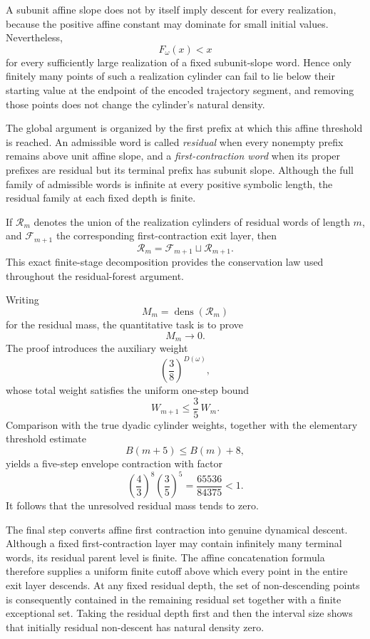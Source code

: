 \documentclass[12pt, oneside]{article}
\numberwithin{equation}{section}
\theoremstyle{definition}
\theoremstyle{plain}
\theoremstyle{remark}
\begin{document}
A subunit affine slope does not by itself imply descent for every
realization, because the positive affine constant may dominate for small
initial values. Nevertheless,
\[
F_\omega(x)<x
\]
for every sufficiently large realization of a fixed subunit-slope word.
Hence only finitely many points of such a realization cylinder can fail to
lie below their starting value at the endpoint of the encoded trajectory
segment, and removing those points does not change the cylinder's natural
density.

The global argument is organized by the first prefix at which this affine
threshold is reached. An admissible word is called \emph{residual} when every
nonempty prefix remains above unit affine slope, and a
\emph{first-contraction word} when its proper prefixes are residual but its
terminal prefix has subunit slope. Although the full family of admissible
words is infinite at every positive symbolic length, the residual family at
each fixed depth is finite.

If \(\mathcal R_m\) denotes the union of the realization cylinders of
residual words of length \(m\), and \(\mathcal F_{m+1}\) the corresponding
first-contraction exit layer, then
\[
\mathcal R_m
=
\mathcal F_{m+1}
\sqcup
\mathcal R_{m+1}.
\]
This exact finite-stage decomposition provides the conservation law used
throughout the residual-forest argument.

Writing
\[
M_m
=
\operatorname{dens}(\mathcal R_m)
\]
for the residual mass, the quantitative task is to prove
\[
M_m\longrightarrow0.
\]
The proof introduces the auxiliary weight
\[
\left(\frac38\right)^{D(\omega)},
\]
whose total weight satisfies the uniform one-step bound
\[
W_{m+1}\le\frac35\,W_m.
\]
Comparison with the true dyadic cylinder weights, together with
the elementary threshold estimate
\[
B(m+5)\le B(m)+8,
\]
yields a five-step envelope contraction with factor
\[
\left(\frac43\right)^8
\left(\frac35\right)^5
=
\frac{65536}{84375}
<1.
\]
It follows that the unresolved residual mass tends to zero.

The final step converts affine first contraction into genuine dynamical
descent. Although a fixed first-contraction layer may contain infinitely
many terminal words, its residual parent level is finite. The affine
concatenation formula therefore supplies a uniform finite cutoff above
which every point in the entire exit layer descends. At any fixed residual
depth, the set of non-descending points is consequently contained in the
remaining residual set together with a finite exceptional set. Taking the
residual depth first and then the interval size shows that initially
residual non-descent has natural density zero.
\end{document}
